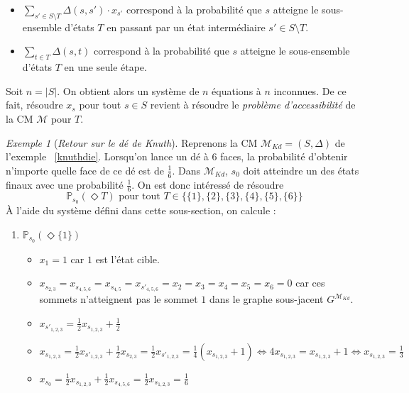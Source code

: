 \documentclass[12pt,a4paper]{report}
\theoremstyle{definition}%
\theoremstyle{remark}
\newtheorem{example}{Exemple}[chapter]
\let\labelitemi\labelitemii
\begin{document}
\begin{itemize}
\renewcommand{\labelitemi}{\tiny$\bullet$}
	\item $ \sum_{s' \in S \setminus T}  \Delta(s, s') \cdot x_{s'} $ correspond à la probabilité que $s$ atteigne le sous-ensemble d'états $T$ en passant par un état intermédiaire $s' \in S \setminus T$.
	\item $\sum_{t \in T} \Delta(s, t)$ correspond à la probabilité que $s$ atteigne le sous-ensemble d'états $T$ en une seule étape.
\end{itemize}
Soit $n = |S|$. On obtient alors un système de $n$ équations à $n$ inconnues. De ce fait, résoudre $x_s$ pour tout $s\in S$ revient à résoudre le \textit{problème d'accessibilité} de la CM $\mathcal{M}$ pour $T$.

\begin{example}[\textit{Retour sur le dé de Knuth}]
	Reprenons la CM $\mathcal{M}_{Kd} = (S, \Delta)$ de l'exemple ~\ref{knuthdie}. Lorsqu'on lance un dé à $6$ faces, la probabilité d'obtenir n'importe quelle face de ce dé est de $\frac{1}{6}$. Dans $\mathcal{M}_{Kd}$, $s_0$ doit atteindre un des états finaux avec une probabilité $\frac{1}{6}$. On est donc intéressé de résoudre \[\mathbb{P}_{s_0}(\Diamond T) \text{ pour tout }T \in \{\{1\},\{2\},\{3\},\{4\},\{5\},\{6\}\} \]
	\`A l'aide du système défini dans cette sous-section, on calcule :
	\begin{spacing}{1.5}
	\begin{enumerate}
		\item $\mathbb{P}_{s_0} (\Diamond \{1\})$
		\begin{itemize}
			\renewcommand{\labelitemi}{\tiny$\bullet$}
			\item $x_1 = 1 $ car $1$ est l'état cible.
			\item $x_{s_{2, 3}} = x_{s_{4, 5, 6}} = x_{s_{4, 5}} = x_{s'_{4, 5, 6}} = x_2 = x_3 = x_4 = x_5 = x_6 = 0$ car ces sommets n'atteignent pas le sommet $1$ dans le graphe sous-jacent $G^{\mathcal{M}_{Kd}}$.
			\item $x_{s'_{1, 2, 3}} = \frac{1}{2} x_{s_{1, 2, 3}} + \frac{1}{2}$
			\item $x_{s_{1, 2, 3}} = \frac{1}{2} x_{s'_{1, 2, 3}} + \frac{1}{2}x_{s_{2, 3}} = \frac{1}{2} x_{s'_{1, 2, 3}} = \frac{1}{4} (x_{s_{1, 2, 3}} + 1) \Leftrightarrow
			4 x_{s_{1, 2, 3}} =x_{s_{1, 2, 3}} + 1 \Leftrightarrow x_{s_{1, 2, 3}} = \frac{1}{3}$
			\item $x_{s_0} = \frac{1}{2} x_{s_{1,2,3}} + \frac{1}{2} x_{s_{4, 5, 6}} = \frac{1}{2} x_{s_{1,2,3}} = \frac{1}{6}$

\end{itemize}
\end{enumerate}
\end{spacing}
\end{example}
\end{document}
